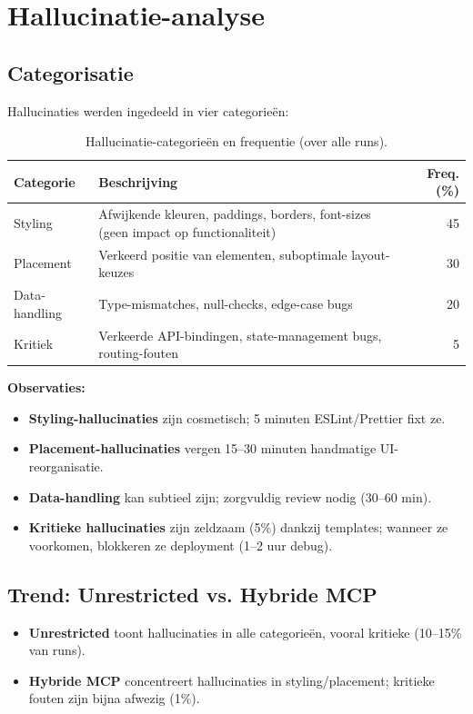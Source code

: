 \section{Hallucinatie-analyse}

\subsection{Categorisatie}

Hallucinaties werden ingedeeld in vier categorieën:

\begin{table}[h]
\small
\begin{tabularx}{\textwidth}{|l|X|r|}
\hline
\textbf{Categorie} & \textbf{Beschrijving} & \textbf{Freq. (\%)} \\
\hline
Styling & Afwijkende kleuren, paddings, borders, font-sizes (geen impact op functionaliteit) & 45 \\
Placement & Verkeerd positie van elementen, suboptimale layout-keuzes & 30 \\
Data-handling & Type-mismatches, null-checks, edge-case bugs & 20 \\
Kritiek & Verkeerde API-bindingen, state-management bugs, routing-fouten & 5 \\
\hline
\end{tabularx}
\caption{Hallucinatie-categorieën en frequentie (over alle runs).}
\label{tab:hallucination-types}
\end{table}

\noindent
\textbf{Observaties:}
\begin{itemize}
  \item \textbf{Styling-hallucinaties} zijn cosmetisch; 5 minuten ESLint/Prettier fixt ze.
  \item \textbf{Placement-hallucinaties} vergen 15--30 minuten handmatige UI-reorganisatie.
  \item \textbf{Data-handling} kan subtieel zijn; zorgvuldig review nodig (30--60 min).
  \item \textbf{Kritieke hallucinaties} zijn zeldzaam (5\%) dankzij templates; wanneer ze voorkomen, blokkeren ze deployment (1--2 uur debug).
\end{itemize}

\subsection{Trend: Unrestricted vs. Hybride MCP}

\begin{itemize}
  \item \textbf{Unrestricted} toont hallucinaties in alle categorieën, vooral kritieke (10--15\% van runs).
  \item \textbf{Hybride MCP} concentreert hallucinaties in styling/placement; kritieke fouten zijn bijna afwezig (1\%).
\end{itemize}


